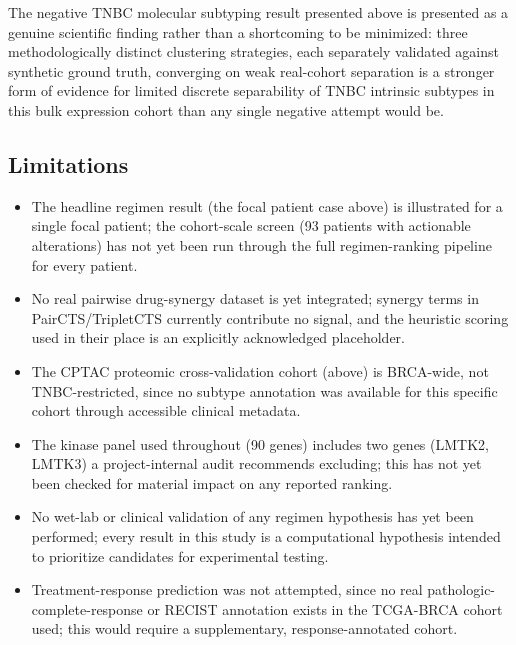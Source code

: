 \documentclass[10pt,letterpaper]{article}
\begin{document}
The negative TNBC molecular subtyping result presented above is presented as a genuine scientific finding rather than a shortcoming to be minimized: three methodologically distinct clustering strategies, each separately validated against synthetic ground truth, converging on weak real-cohort separation is a stronger form of evidence for limited discrete separability of TNBC intrinsic subtypes in this bulk expression cohort than any single negative attempt would be.

\subsection*{Limitations}
\begin{itemize}
\item The headline regimen result (the focal patient case above) is illustrated for a single focal patient; the cohort-scale screen (93 patients with actionable alterations) has not yet been run through the full regimen-ranking pipeline for every patient.
\item No real pairwise drug-synergy dataset is yet integrated; synergy terms in PairCTS/TripletCTS currently contribute no signal, and the heuristic scoring used in their place is an explicitly acknowledged placeholder.
\item The CPTAC proteomic cross-validation cohort (above) is BRCA-wide, not TNBC-restricted, since no subtype annotation was available for this specific cohort through accessible clinical metadata.
\item The kinase panel used throughout (90 genes) includes two genes (LMTK2, LMTK3) a project-internal audit recommends excluding; this has not yet been checked for material impact on any reported ranking.
\item No wet-lab or clinical validation of any regimen hypothesis has yet been performed; every result in this study is a computational hypothesis intended to prioritize candidates for experimental testing.
\item Treatment-response prediction was not attempted, since no real pathologic-complete-response or RECIST annotation exists in the TCGA-BRCA cohort used; this would require a supplementary, response-annotated cohort.
\end{itemize}
\end{document}
